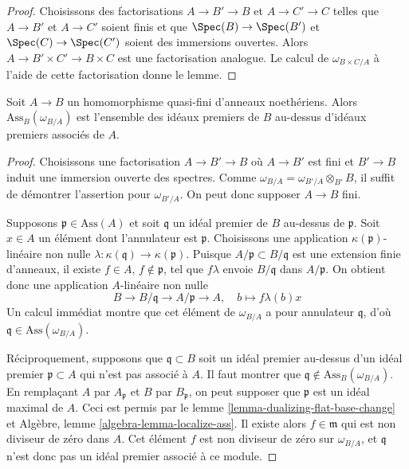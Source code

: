 \begin{proof}
Choisissons des factorisations $A \to B' \to B$ et $A \to C' \to C$ telles que
$A \to B'$ et $A \to C'$ soient finis et que $\Spec(B) \to \Spec(B')$
et $\Spec(C) \to \Spec(C')$ soient des immersions ouvertes. Alors
$A \to B' \times C' \to B \times C$ est une factorisation analogue.
Le calcul de $\omega_{B \times C/A}$ à l'aide de cette factorisation
donne le lemme.
\end{proof}

\begin{lemma}
\label{lemma-dualizing-associated-primes}
Soit $A \to B$ un homomorphisme quasi-fini d'anneaux noethériens.
Alors $\text{Ass}_B(\omega_{B/A})$ est l'ensemble des idéaux premiers de $B$
au-dessus d'idéaux premiers associés de $A$.
\end{lemma}

\begin{proof}
Choisissons une factorisation $A \to B' \to B$ où $A \to B'$ est fini et
$B' \to B$ induit une immersion ouverte des spectres. Comme
$\omega_{B/A} = \omega_{B'/A} \otimes_{B'} B$, il suffit
de démontrer l'assertion pour $\omega_{B'/A}$. On peut donc supposer $A \to B$
fini.

\medskip\noindent
Supposons $\mathfrak p \in \text{Ass}(A)$ et soit $\mathfrak q$ un idéal premier
de $B$ au-dessus de $\mathfrak p$. Soit $x \in A$ un élément dont
l'annulateur est $\mathfrak p$. Choisissons une application $\kappa(\mathfrak p)$-linéaire
non nulle $\lambda : \kappa(\mathfrak q) \to \kappa(\mathfrak p)$.
Puisque $A/\mathfrak p \subset B/\mathfrak q$ est une extension finie
d'anneaux, il existe $f \in A$, $f \not \in \mathfrak p$,
tel que $f\lambda$ envoie $B/\mathfrak q$ dans $A/\mathfrak p$.
On obtient donc une application $A$-linéaire non nulle
$$
B \to B/\mathfrak q \to A/\mathfrak p \to A,\quad
b \mapsto f\lambda(b)x
$$
Un calcul immédiat montre que cet élément de $\omega_{B/A}$
a pour annulateur $\mathfrak q$, d'où
$\mathfrak q \in \text{Ass}(\omega_{B/A})$.

\medskip\noindent
Réciproquement, supposons que $\mathfrak q \subset B$ soit un idéal premier
au-dessus d'un idéal premier $\mathfrak p \subset A$ qui n'est pas associé
à $A$. Il faut montrer que
$\mathfrak q \not \in \text{Ass}_B(\omega_{B/A})$.
En remplaçant $A$ par $A_\mathfrak p$ et $B$ par
$B_\mathfrak p$, on peut supposer que $\mathfrak p$ est un idéal maximal
de $A$. Ceci est permis par le lemme \ref{lemma-dualizing-flat-base-change} et
Algèbre, lemme \ref{algebra-lemma-localize-ass}.
Il existe alors $f \in \mathfrak m$
qui est non diviseur de zéro dans $A$.
Cet élément $f$ est non diviseur de zéro sur $\omega_{B/A}$,
et $\mathfrak q$ n'est donc pas un idéal premier associé à ce module.
\end{proof}

